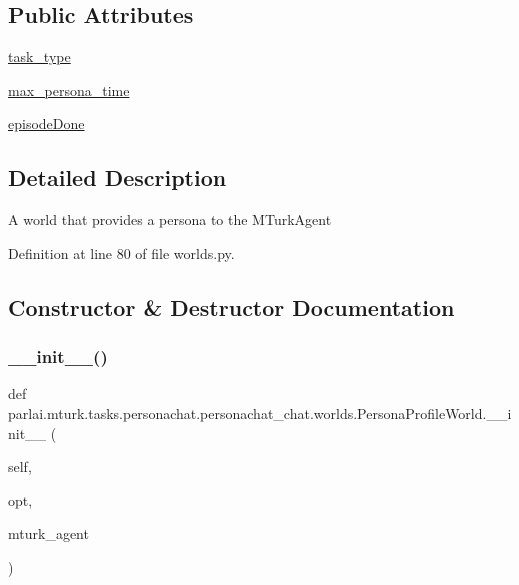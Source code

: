 \subsection*{Public Attributes}
\begin{DoxyCompactItemize}
\item 
\hyperlink{classparlai_1_1mturk_1_1tasks_1_1personachat_1_1personachat__chat_1_1worlds_1_1PersonaProfileWorld_a1f5c0449ba2b78995696e5d428ddc71a}{task\+\_\+type}
\item 
\hyperlink{classparlai_1_1mturk_1_1tasks_1_1personachat_1_1personachat__chat_1_1worlds_1_1PersonaProfileWorld_ab8a509dc9003c556658d8b07b4310803}{max\+\_\+persona\+\_\+time}
\item 
\hyperlink{classparlai_1_1mturk_1_1tasks_1_1personachat_1_1personachat__chat_1_1worlds_1_1PersonaProfileWorld_ae481c1bb5d65a01eba920cd88265e41b}{episode\+Done}
\end{DoxyCompactItemize}


\subsection{Detailed Description}
\begin{DoxyVerb}A world that provides a persona to the MTurkAgent\end{DoxyVerb}
 

Definition at line 80 of file worlds.\+py.



\subsection{Constructor \& Destructor Documentation}
\mbox{\label{classparlai_1_1mturk_1_1tasks_1_1personachat_1_1personachat__chat_1_1worlds_1_1PersonaProfileWorld_a0d3decd1783860bca545ff69f49a8629}} 
\subsubsection{\texorpdfstring{\+\_\+\+\_\+init\+\_\+\+\_\+()}{\_\_init\_\_()}}
{\footnotesize\ttfamily def parlai.\+mturk.\+tasks.\+personachat.\+personachat\+\_\+chat.\+worlds.\+Persona\+Profile\+World.\+\_\+\+\_\+init\+\_\+\+\_\+ (\begin{DoxyParamCaption}\item[{}]{self,  }\item[{}]{opt,  }\item[{}]{mturk\+\_\+agent }\end{DoxyParamCaption})}



